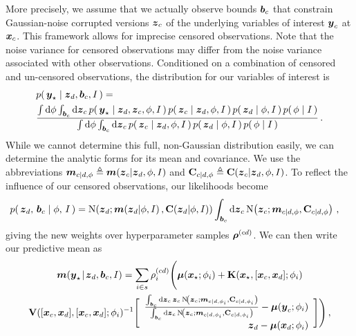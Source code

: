 \documentclass{acmsmall}
\begin{document}
More precisely, we assume that we actually observe bounds $\boldsymbol{b}_c$ that constrain Gaussian-noise corrupted versions $\boldsymbol{z}_c$ of the underlying variables of interest $\boldsymbol{y}_c$ at $\boldsymbol{x}_c$. This framework allows for imprecise censored observations. Note that the noise variance for censored observations may differ from the noise variance associated with other observations. Conditioned on a combination of censored and un-censored observations, the distribution for our variables of interest is
\begin{align*} %
& \p{\vyst}{\vzD,\vect{b}_c,I}=\nonumber\\
& \frac{\int\ud\phi\int_{\vect{b}_c}\ud\vz_c\, \p{\vyst}{\vzD,\vz_c,\phi,I}\p{\vz_c}{\vzD,\phi,I}\p{\vzD}{\phi,I}\p{\phi}{I}}
{\int\ud\phi\int_{\vect{b}_c}\ud\vz_c\, \p{\vz_c}{\vzD,\phi,I}\p{\vzD}{\phi,I}\p{\phi}{I}}\,.
\end{align*}
While we cannot determine this full, non-Gaussian distribution easily, we can determine the analytic forms for its mean and covariance. We use the abbreviations $\boldsymbol{m}_{c|d,\phi}\triangleq\boldsymbol{m}\!\left({\boldsymbol{z}}_{c}\middle\vert\boldsymbol{z}_d,\phi,I\right)$ and $\mathbf{C}_{c|d,\phi}\triangleq\mathbf{C}\!\left({\boldsymbol{z}}_{c}\middle\vert\boldsymbol{z}_d,\phi,I\right)$.
To reflect the influence of our censored observations, our likelihoods become
\begin{align*}
 \p{\vzD,\,\vect{b}_c}{\phi,\,I}
  &= \N{\vzD}{\meanskinnysub{\vz}{d}{\phi,I}}{\covskinnysub{\vz}{d}{\phi,I}}\int_{\vect{b}_c}\ud\vz_c\,\N{\vz_c}{\vect{m}_{c|d,\phi}}{\mat{C}_{c|d,\phi}}\,,
\end{align*}
giving the new weights over hyperparameter samples $\boldsymbol{\rho}^{(cd)}$.
We can then write our predictive mean as
\begin{multline*} %
\meansub{\vy}{\star}{\vzD,\vect{b}_c,I}=\sum_{i\in s}\rho^{(cd)}_i\Biggl(\vect{\mu}(\vxst;\phi_i)+\mat{K}(\vxst,[\vx_c,\vxD];\phi_i)\\\mat{V}([\vx_c,\vxD],[\vx_c,\vxD];\phi_i)^{-1}
\Biggl[\begin{array}{r}
	\frac{\int_{\vect{b}_c}\ud\vz_c\,\vz_c\, \N{\vz_c}{\vect{m}_{c|d,\phi_i}}{\mat{C}_{c|d,\phi_i}}}{\int_{\vect{b}_c}\ud\vz_c\,\N{\vz_c}{\vect{m}_{c|d,\phi_i}}{\mat{C}_{c|d,\phi_i}}}-\vect{\mu}(\vy_c;\phi_i)\\
       \vzD-\vect{\mu}(\vxD;\phi_i)
      \end{array}\Biggr]\Biggr)\,,
\end{multline*}
\end{document}
